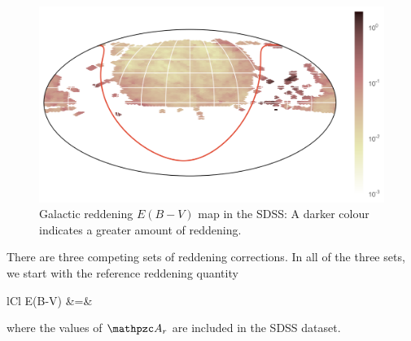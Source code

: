 \begin{figure}[tbp]
	\centering
	\includegraphics[width=\textwidth]{figures/map_extinction_ebv}
	\caption[Galactic reddening map in the SDSS]{Galactic reddening $E(B-V)$ map in the SDSS:
		A darker colour indicates a greater amount of reddening.}
	\label{fig:reddening}
\end{figure}

There are three competing sets of reddening corrections. In all of the three sets, we
start with the reference reddening quantity
	\begin{IEEEeqnarray*}{lCl}
		E(B-V) &=& 
	\end{IEEEeqnarray*}
where the values of $\A_r$ are included in the SDSS dataset.

